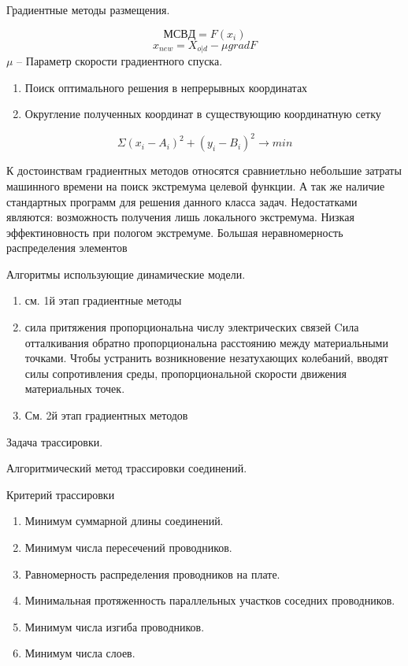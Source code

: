 \documentclass{article}
\begin{document}
	Градиентные методы размещения.

	$$
	МСВД = F (x_i)
	$$
	$$
	x_{new} = X_{o|d} - \mu grad F
	$$
	$ \mu$ -- Параметр скорости градиентного спуска.

	\begin{enumerate}
		\item Поиск оптимального решения в непрерывных координатах
		\item Округление полученных координат в существующию координатную сетку
	\end{enumerate}

	$$
	\Sigma (x_i - A_i)^2 + (y_i - B_i)^2 \to min
	$$
	
	К достоинствам градиентных методов относятся сравниетльно небольшие затраты машинного времени на поиск экстремума целевой функции. А так же наличие стандартных программ для решения данного класса задач. Недостатками являются: возможность получения лишь локального экстремума. Низкая эффектиновность при пологом экстремуме. Большая неравномерность распределения элементов

	Алгоритмы использующие динамические модели.

\begin{enumerate}
	\item см. 1й этап градиентные методы
	\item сила притяжения пропорциональна числу электрических связей
	Cила отталкивания обратно пропорциональна расстоянию между материальными точками. Чтобы устранить возникновение незатухающих колебаний, вводят силы сопротивления среды, пропорциональной скорости движения материальных точек.
	\item См. 2й этап градиентных методов
\end{enumerate}

	Задача трассировки.

	Алгоритмический метод трассировки соединений.
	
	Критерий трассировки
	\begin{enumerate}
		\item Минимум суммарной длины соединений.
		\item Минимум числа пересечений проводников.
		\item Равномерность распределения проводников на плате.
		\item Минимальная протяженность параллельных участков соседних проводников.
		\item Минимум числа изгиба проводников.
		\item Минимум числа слоев.
	\end{enumerate}
\end{document}
